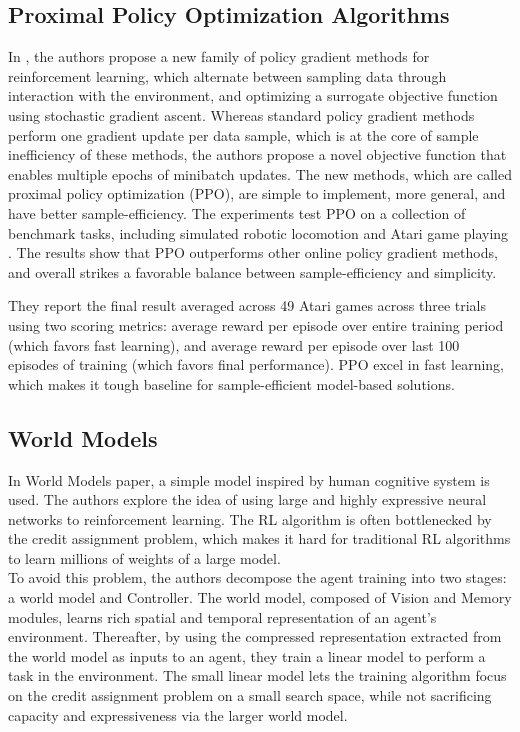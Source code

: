 \subsection{Proximal Policy Optimization Algorithms}

In \cite{Algo.PPO}, the authors propose a new family of policy gradient methods for reinforcement learning, which alternate between sampling data through interaction with the environment, and optimizing a surrogate objective function using stochastic gradient ascent. Whereas standard policy gradient methods perform one gradient update per data sample, which is at the core of sample inefficiency of these methods, the authors propose a novel objective function that enables multiple epochs of minibatch updates. The new methods, which are called proximal policy optimization (PPO), are simple to implement, more general, and have better sample-efficiency. The experiments test PPO on a collection of benchmark tasks, including simulated robotic locomotion and Atari game playing \cite{Code.ALE}. The results show that PPO outperforms other online policy gradient methods, and overall strikes a favorable balance between sample-efficiency and simplicity.

They report the final result averaged across 49 Atari games across three trials using two scoring metrics: average reward per episode over entire training period (which favors fast learning), and average reward per episode over last 100 episodes of training (which favors final performance). PPO excel in fast learning, which makes it tough baseline for sample-efficient model-based solutions.

\subsection{World Models} \label{Sec.WorldModels}

In World Models \cite{Algo.WorldModels} paper, a simple model inspired by human cognitive system is used. The authors explore the idea of using large and highly expressive neural networks to reinforcement learning. The RL algorithm is often bottlenecked by the credit assignment problem, which makes it hard for traditional RL algorithms to learn millions of weights of a large model. \\
To avoid this problem, the authors decompose the agent training into two stages: a world model and Controller. The world model, composed of Vision and Memory modules, learns rich spatial and temporal representation of an agent's environment. Thereafter, by using the compressed representation extracted from the world model as inputs to an agent, they train a linear model to perform a task in the environment. The small linear model lets the training algorithm focus on the credit assignment problem on a small search space, while not sacrificing capacity and expressiveness via the larger world model.


